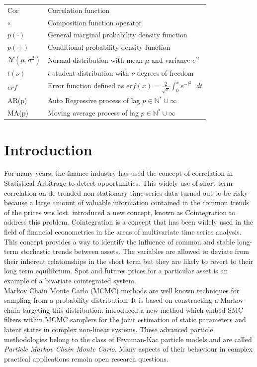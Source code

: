 \documentclass[11pt,a4,twosided,singlespacing,titlepagenumber=on]{scrreprt}
\numberwithin{equation}{chapter} %
\theoremstyle{remark}
\begin{document}
\begin{table}[h]
\begin{tabular}{ll}
Cor									& Correlation function \\
$\circ$								& Composition function operator \\
$p(\cdot)$							& General marginal probability density function \\
$p(\cdot| \cdot)$					& Conditional probability density function \\
$\mathcal{N}(\mu, \sigma^2)$		& Normal distribution with mean $\mu$ and variance $\sigma^2$ \\
$t(\nu)$							& $t$-student distribution with $\nu$ degrees of freedom \\
$erf$								& Error function defined as $erf(x) = \frac{2}{\sqrt{\pi}} \int_0^x e^{-t^2}\text{ }dt$ \\
AR(p)									& Auto Regressive process of lag $p \in \mathbb{N}^* \cup \infty$ \\
MA(p)  								& Moving average process of lag $p \in \mathbb{N}^* \cup \infty$ \\
\hline
\end{tabular}
\end{table}

\chapter{Introduction}

For many years, the finance industry has used the concept of correlation in Statistical Arbitrage to detect opportunities. This widely use of short-term correlation on de-trended non-stationary time series data turned out to be risky because a large amount of valuable information contained in the common trends of the prices was lost. \cite{engle1987} introduced a new concept, known as Cointegration to address this problem. Cointegration is a concept that has been widely used in the field of financial econometrics in the areas of multivariate time series analysis. This concept provides a way to identify the influence of common and stable long-term stochastic trends between assets. The variables are allowed to deviate from their inherent relationships in the short term but they are likely to revert to their long term equilibrium. Spot and futures prices for a particular asset is an example of a bivariate cointegrated system. \\

\noindent
Markov Chain Monte Carlo (MCMC) methods are well known techniques for sampling from a probability distribution. It is based on constructing a Markov chain targeting this distribution. \cite{andrieu2010} introduced a new method which embed SMC filters within MCMC samplers for the joint estimation of static parameters and latent states in complex non-linear systems. These advanced particle methodologies belong to the class of Feynman-Kac particle models and are called \textit{Particle Markov Chain Monte Carlo}. Many aspects of their behaviour in complex practical applications remain open research questions. \\
\end{document}
